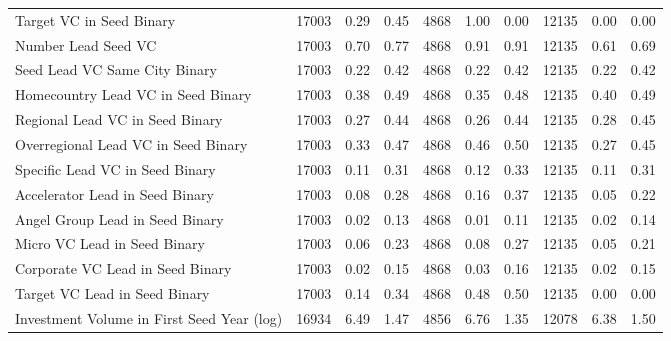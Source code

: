 {\begin{table}[!h]
{\begin{tabular}[t]{lrrrrrrrrr}
Target VC in Seed Binary & 17003 & 0.29 & 0.45 & 4868 & 1.00 & 0.00 & 12135 & 0.00 & 0.00\\
Number Lead Seed VC & 17003 & 0.70 & 0.77 & 4868 & 0.91 & 0.91 & 12135 & 0.61 & 0.69\\
Seed Lead VC Same City Binary & 17003 & 0.22 & 0.42 & 4868 & 0.22 & 0.42 & 12135 & 0.22 & 0.42\\
Homecountry Lead VC in Seed Binary & 17003 & 0.38 & 0.49 & 4868 & 0.35 & 0.48 & 12135 & 0.40 & 0.49\\
\addlinespace
Regional Lead VC in Seed Binary & 17003 & 0.27 & 0.44 & 4868 & 0.26 & 0.44 & 12135 & 0.28 & 0.45\\
Overregional Lead VC in Seed Binary & 17003 & 0.33 & 0.47 & 4868 & 0.46 & 0.50 & 12135 & 0.27 & 0.45\\
Specific Lead VC in Seed Binary & 17003 & 0.11 & 0.31 & 4868 & 0.12 & 0.33 & 12135 & 0.11 & 0.31\\
Accelerator Lead in Seed Binary & 17003 & 0.08 & 0.28 & 4868 & 0.16 & 0.37 & 12135 & 0.05 & 0.22\\
Angel Group Lead in Seed Binary & 17003 & 0.02 & 0.13 & 4868 & 0.01 & 0.11 & 12135 & 0.02 & 0.14\\
\addlinespace
Micro VC Lead in Seed Binary & 17003 & 0.06 & 0.23 & 4868 & 0.08 & 0.27 & 12135 & 0.05 & 0.21\\
Corporate VC Lead in Seed Binary & 17003 & 0.02 & 0.15 & 4868 & 0.03 & 0.16 & 12135 & 0.02 & 0.15\\
Target VC Lead in Seed Binary & 17003 & 0.14 & 0.34 & 4868 & 0.48 & 0.50 & 12135 & 0.00 & 0.00\\
Investment Volume in First Seed Year (log) & 16934 & 6.49 & 1.47 & 4856 & 6.76 & 1.35 & 12078 & 6.38 & 1.50\\
\bottomrule
\end{tabular}}
\end{table}
}
